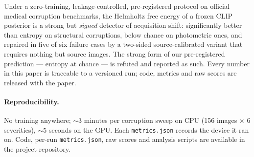 \documentclass[11pt]{article}
\begin{document}
Under a zero-training, leakage-controlled, pre-registered protocol on official
medical corruption benchmarks, the Helmholtz free energy of a frozen CLIP
posterior is a strong but \emph{signed} detector of acquisition shift:
significantly better than entropy on structural corruptions, below chance on
photometric ones, and repaired in five of six failure cases by a two-sided
source-calibrated variant that requires nothing but source images. The strong
form of our pre-registered prediction --- entropy at chance --- is refuted and
reported as such. Every number in this paper is traceable to a versioned run;
code, metrics and raw scores are released with the paper.

\paragraph{Reproducibility.} No training anywhere; $\sim$3 minutes per
corruption sweep on CPU (156 images $\times$ 6 severities), $\sim$5 seconds on
the GPU. Each \texttt{metrics.json} records the device it ran on.
Code, per-run \texttt{metrics.json}, raw scores and analysis scripts are
available in the project repository.



\end{document}
